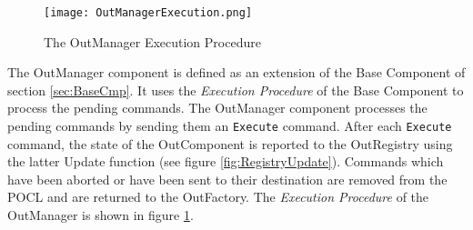 \begin{figure}[h]
 \centering
 \texttt{[image: OutManagerExecution.png]}
 \caption{The OutManager Execution Procedure}
 \label{fig:OutManagerExecution}
\end{figure}

The OutManager component is defined as an extension of the Base Component of section \ref{sec:BaseCmp}. It uses the \textit{Execution Procedure} of the Base Component to process the pending commands. The OutManager component processes the pending commands by sending them an \texttt{Execute} command. After each \texttt{Execute} command, the state of the OutComponent is reported to the OutRegistry using the latter Update function (see figure \ref{fig:RegistryUpdate}). Commands which have been aborted or have been sent to their destination are removed from the POCL and are returned to the OutFactory. The \textit{Execution Procedure} of the OutManager is shown in figure \ref{fig:OutManagerExecution}.


